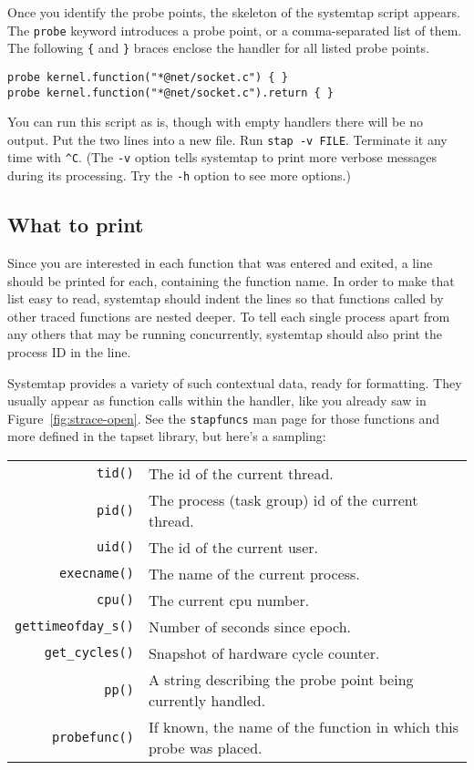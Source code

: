 \documentclass{article}
\begin{document}
Once you identify the probe points, the skeleton of the systemtap
script appears.  The \verb+probe+ keyword introduces a probe point, or
a comma-separated list of them.  The following \verb+{+ and \verb+}+
braces enclose the handler for all listed probe points.
\begin{verbatim}
probe kernel.function("*@net/socket.c") { }
probe kernel.function("*@net/socket.c").return { }
\end{verbatim}
You can run this script as is, though with empty handlers there will
be no output.  Put the two lines into a new file.  Run
\verb+stap -v FILE+.  Terminate it any time with \verb+^C+.  (The
\verb+-v+ option tells systemtap to print more verbose messages during
its processing.  Try the \verb+-h+ option to see more options.)

\subsection{What to print}

Since you are interested in each function that was entered and exited,
a line should be printed for each, containing the function name.  In
order to make that list easy to read, systemtap should indent the
lines so that functions called by other traced functions are nested
deeper.  To tell each single process apart from any others that may be
running concurrently, systemtap should also print the process ID in
the line.

Systemtap provides a variety of such contextual data, ready for
formatting.  They usually appear as function calls within the handler,
like you already saw in Figure~\ref{fig:strace-open}.  See the
\verb+stapfuncs+ man page for those functions and more defined in the
tapset library, but here's a sampling:

\begin{tabular}{rl}
\verb+tid()+ & The id of the current thread. \\
\verb+pid()+ & The process (task group) id of the current thread. \\
\verb+uid()+ & The id of the current user. \\
\verb+execname()+ & The name of the current process. \\
\verb+cpu()+ & The current cpu number. \\
\verb+gettimeofday_s()+ & Number of seconds since epoch. \\
\verb+get_cycles()+ & Snapshot of hardware cycle counter. \\
\verb+pp()+ & A string describing the probe point being currently handled. \\
\verb+probefunc()+ & If known, the name of the function in which
                     this probe was placed. \\
\end{tabular}
\end{document}
